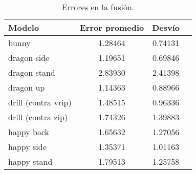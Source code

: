 \begin{table}
	\center
	\begin{tabular}{l*{3}{c}}
		\toprule                                                                  
		Modelo                  &    Error promedio  & Desvío \\ 
		\midrule                                    
		bunny                   &      1.28464       & 0.74131\\
		\midrule                                    
		dragon side             &      1.19651       & 0.69846\\
		dragon stand            &      2.83930       & 2.41398\\
		dragon up               &      1.14363       & 0.88966\\
		\midrule                                    
		drill (contra vrip)     &      1.48515       & 0.96336\\
		drill (contra zip)      &      1.74326       & 1.39883\\
		\midrule                                    
		happy back              &      1.65632       & 1.27056\\
		happy side              &      1.35371       & 1.01163\\
		happy stand             &      1.79513       & 1.25758\\
		\bottomrule                                                               
	\end{tabular}
	\caption{\label{tab:fus_error}Errores en la fusión.}
\end{table}

